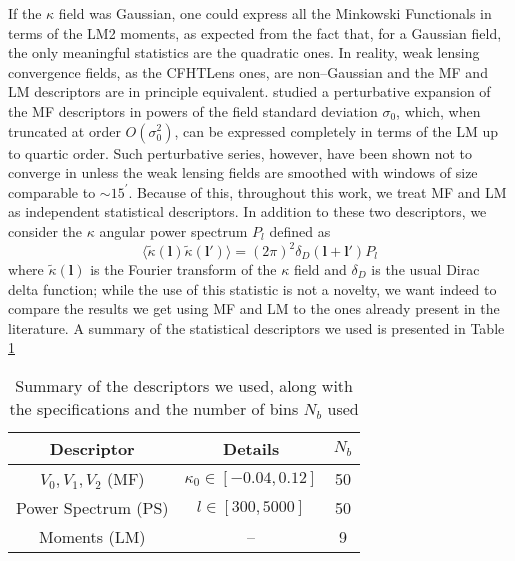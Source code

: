 \documentclass[reprint,aps,prd,superscriptaddress,showkeys]{revtex4-1}
\begin{document}
%
If the $\kappa$ field was Gaussian, one could express all the Minkowski Functionals in terms of the LM2 moments, as expected from the fact that, for a Gaussian field, the only meaningful statistics are the quadratic ones. In reality, weak lensing convergence fields, as the CFHTLens ones, are non--Gaussian and the MF and LM descriptors are in principle equivalent. \citep{Munshi12,Matsubara10} studied a perturbative expansion of the MF descriptors in powers of the field standard deviation $\sigma_0$, which, when truncated at order $O(\sigma_0^2)$, can be expressed completely in terms of the LM up to quartic order. Such perturbative series, however, have been shown not to converge in \citep{Petri2013} unless the weak lensing fields are smoothed with windows of size comparable to $\sim 15^\prime$. Because of this, throughout this work, we treat MF and LM as independent statistical descriptors. In addition to these two descriptors, we consider the $\kappa$ angular power spectrum $P_l$ defined as
\begin{equation}
\label{powerspectrum}
\langle\tilde{\kappa}(\mathbf{l})\tilde{\kappa}(\mathbf{l}')\rangle=(2\pi)^2\delta_D(\mathbf{l}+\mathbf{l}')P_l
\end{equation}  
%
where $\tilde{\kappa}(\mathbf{l})$ is the Fourier transform of the $\kappa$ field and $\delta_D$ is the usual Dirac delta function; while the use of this statistic is not a novelty, we want indeed to compare the results we get using MF and LM to the ones already present in the literature. A summary of the statistical descriptors we used is presented in Table \ref{desctable}
%
\begin{table}
\begin{tabular}{c|c|c} \hline
Descriptor & Details & $N_b$ \\ \hline
$V_0,V_1,V_2$ (MF) & $\kappa_0\in[-0.04,0.12]$ & 50 \\
Power Spectrum (PS) & $l \in [300,5000]$ & 50 \\
Moments (LM) & -- & 9 \\
\end{tabular}
\caption{Summary of the descriptors we used, along with the specifications and the number of bins $N_b$ used}
\label{desctable}
\end{table}
%
\end{document}
